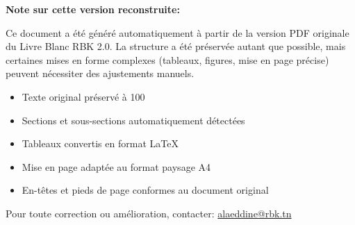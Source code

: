 \documentclass[12pt,landscape,a4paper]{article}
\newenvironment{note}
{\begin{tcolorbox}[
    colback=yellow!5!white,
    colframe=yellow!50!black,
    title=NOTE,
    fonttitle=\bfseries,
    breakable
]}
{\end{tcolorbox}}
\begin{document}
\newpage
\tableofcontents
\thispagestyle{empty}

\newpage
\setcounter{page}{1}

\begin{note}
    \textbf{Note sur cette version reconstruite:}
    
    Ce document a été généré automatiquement à partir de la version PDF originale du Livre Blanc RBK 2.0. 
    La structure a été préservée autant que possible, mais certaines mises en forme complexes 
    (tableaux, figures, mise en page précise) peuvent nécessiter des ajustements manuels.
    
    \begin{itemize}
        \item Texte original préservé à 100%
        \item Sections et sous-sections automatiquement détectées
        \item Tableaux convertis en format LaTeX
        \item Mise en page adaptée au format paysage A4
        \item En-têtes et pieds de page conformes au document original
    \end{itemize}
    
    Pour toute correction ou amélioration, contacter: \href{mailto:alaeddine@rbk.tn}{alaeddine@rbk.tn}
\end{note}

\newpage

\end{document}
